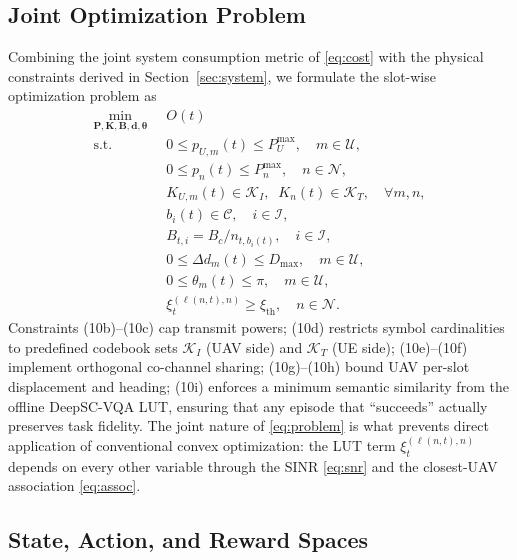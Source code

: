 \subsection{Joint Optimization Problem}\label{subsec:problem}
Combining the joint system consumption metric of \eqref{eq:cost} with
the physical constraints derived in Section~\ref{sec:system}, we
formulate the slot-wise optimization problem as
\begin{subequations}\label{eq:problem}
\begin{align}
\min_{\mathbf{P},\mathbf{K},\mathbf{B},\mathbf{d},\boldsymbol{\theta}}
  \;\; & O(t) \\
\text{s.t.}\;\;
  & 0 \le p_{U,m}(t) \le P^{\max}_U,\quad m\in\mathcal{U}, \\
  & 0 \le p_{n}(t) \le P^{\max}_{n},\quad n\in\mathcal{N}, \\
  & K_{U,m}(t)\in\mathcal{K}_I,\;\; K_n(t)\in\mathcal{K}_T,\quad
    \forall m,n, \\
  & b_{i}(t)\in\mathcal{C},\quad i\in\mathcal{I},\\
  & B_{t,i} = B_c/n_{t,b_{i}(t)},\quad i\in\mathcal{I}, \\
  & 0 \le \Delta d_{m}(t) \le D_{\max},\quad m\in\mathcal{U}, \\
  & 0 \le \theta_{m}(t)\le \pi,\quad m\in\mathcal{U}, \\
  & \xi^{(\ell(n,t),n)}_{t}\ge \xi_{\mathrm{th}},\quad n\in\mathcal{N}.
\end{align}
\end{subequations}
Constraints (10b)--(10c) cap transmit powers; (10d) restricts symbol
cardinalities to predefined codebook sets $\mathcal{K}_I$ (UAV side)
and $\mathcal{K}_T$ (UE side); (10e)--(10f) implement orthogonal
co-channel sharing; (10g)--(10h) bound UAV per-slot displacement and
heading; (10i) enforces a minimum semantic similarity from the offline
DeepSC-VQA LUT, ensuring that any episode that ``succeeds'' actually
preserves task fidelity. The joint nature of \eqref{eq:problem} is what
prevents direct application of conventional convex optimization: the
LUT term $\xi^{(\ell(n,t),n)}_t$ depends on every other variable through
the SINR \eqref{eq:snr} and the closest-UAV association \eqref{eq:assoc}.

\subsection{State, Action, and Reward Spaces}\label{subsec:state}
